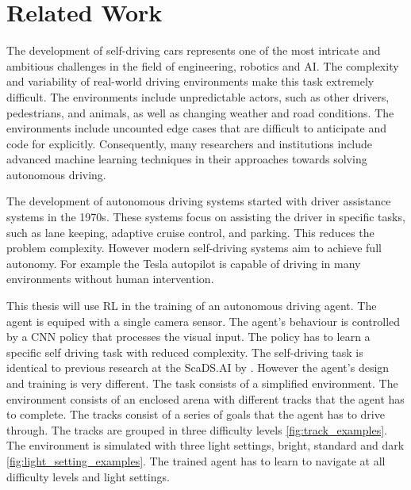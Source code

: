 \chapter{Related Work}
\label{cha:Related Work}
\acresetall


The development of self-driving cars represents one of the most intricate and ambitious challenges in the field of engineering, robotics and \ac{AI}. The complexity and variability of real-world driving environments make this task extremely difficult. The environments include unpredictable actors, such as other drivers, pedestrians, and animals, as well as changing weather and road conditions. The environments include uncounted edge cases that are difficult to anticipate and code for explicitly. Consequently, many researchers and institutions include advanced machine learning techniques in their approaches towards solving autonomous driving.

The development of autonomous driving systems started with driver assistance systems in the 1970s. These systems focus on assisting the driver in specific tasks, such as lane keeping, adaptive cruise control, and parking. This reduces the problem complexity. However modern self-driving systems aim to achieve full autonomy. For example the Tesla autopilot is capable of driving in many environments without human intervention.

This thesis will use \acl{RL} in the training of an autonomous driving agent. The agent is equiped with a single camera sensor. The agent's behaviour is controlled by a \ac{CNN} policy that processes the visual input. The policy has to learn a specific self driving task with reduced complexity. The self-driving task is identical to previous research at the ScaDS.AI by \textcite{maximilian}. However the agent's design and training is very different.
The task consists of a simplified environment. The environment consists of an enclosed arena with different tracks that the agent has to complete. The tracks consist of a series of goals that the agent has to drive through. The tracks are grouped in three difficulty levels \ref{fig:track_examples}.
The environment is simulated with three light settings, bright, standard and dark \ref{fig:light_setting_examples}. The trained agent has to learn to navigate at all difficulty levels and light settings.

